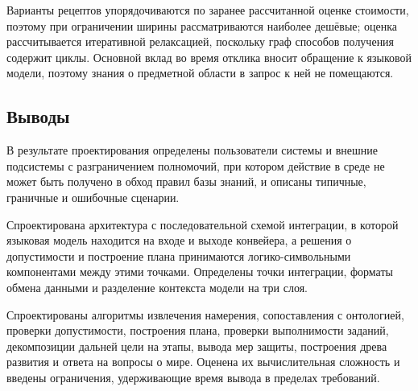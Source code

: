 Варианты рецептов упорядочиваются по заранее рассчитанной оценке стоимости, поэтому при
ограничении ширины рассматриваются наиболее дешёвые; оценка рассчитывается итеративной
релаксацией, поскольку граф способов получения содержит циклы. Основной вклад во время
отклика вносит обращение к языковой модели, поэтому знания о предметной области в запрос
к ней не помещаются.

\FloatBarrier
\subsection{Выводы}

В результате проектирования определены пользователи системы и внешние подсистемы с
разграничением полномочий, при котором действие в среде не может быть получено в
обход правил базы знаний, и описаны типичные, граничные и ошибочные сценарии.

Спроектирована архитектура с последовательной схемой интеграции, в которой
языковая модель находится на входе и выходе конвейера, а решения о допустимости и
построение плана принимаются логико-символьными компонентами между этими точками.
Определены точки интеграции, форматы обмена данными и разделение контекста модели на
три слоя.

Спроектированы алгоритмы извлечения намерения, сопоставления с онтологией, проверки
допустимости, построения плана, проверки выполнимости заданий, декомпозиции дальней
цели на этапы, вывода мер защиты, построения древа развития и ответа на вопросы о мире.
Оценена их вычислительная сложность и введены ограничения, удерживающие время вывода в
пределах требований.
